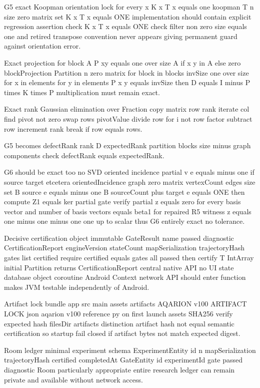 G5 exact Koopman orientation lock for every x K x T x equals one koopman T n size zero matrix set K x T x equals ONE implementation should contain explicit regression assertion check K x T x equals ONE check filter non zero size equals one and retired transpose convention never appears giving permanent guard against orientation error.

Exact projection for block A P xy equals one over size A if x y in A else zero blockProjection Partition n zero matrix for block in blocks invSize one over size for x in elements for y in elements P x y equals invSize then D equals I minus P times K times P multiplication must remain exact.

Exact rank Gaussian elimination over Fraction copy matrix row rank iterate col find pivot not zero swap rows pivotValue divide row for i not row factor subtract row increment rank break if row equals rows.

G5 becomes defectRank rank D expectedRank partition blocks size minus graph components check defectRank equals expectedRank.

G6 should be exact too no SVD oriented incidence partial v e equals minus one if source target etcetera orientedIncidence graph zero matrix vertexCount edges size set B source e equals minus one B sourceCount plus target e equals ONE then compute Z1 equals ker partial gate verify partial z equals zero for every basis vector and number of basis vectors equals beta1 for repaired R5 witness z equals one minus one minus one one up to scalar thus G6 entirely exact no tolerance.

Decisive certification object immutable GateResult name passed diagnostic CertificationReport engineVersion stateCount mapSerialization trajectoryHash gates list certified require certified equals gates all passed then certify T IntArray initial Partition returns CertificationReport central native API no UI state database object coroutine Android Context network API should enter function makes JVM testable independently of Android.

Artifact lock bundle app src main assets artifacts AQARION v100 ARTIFACT LOCK json aqarion v100 reference py on first launch assets SHA256 verify expected hash filesDir artifacts distinction artifact hash not equal semantic certification so startup fail closed if artifact bytes not match expected digest.

Room ledger minimal experiment schema ExperimentEntity id n mapSerialization trajectoryHash certified completedAt GateEntity id experimentId gate passed diagnostic Room particularly appropriate entire research ledger can remain private and available without network access.

